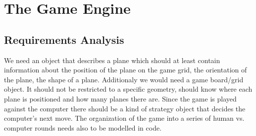 \documentclass{report}
\begin{document}
\chapter {The Game Engine }
\section{Requirements Analysis}
We need an object that describes a plane which should at least contain information about the position of the plane on the game grid, the orientation of the plane, the shape of a plane. Additionaly we would need a game board/grid object. It should not be restricted to a specific geometry, should know where each plane is positioned and how many planes there are. Since the game is played against the computer there should be a kind of strategy object that decides the computer's next move. The organization of the game into a series of human vs. computer rounds needs also to be modelled in code.






\end{document}
